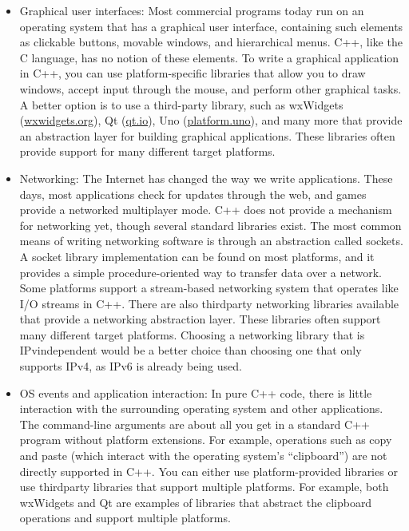 \begin{itemize}
\item
Graphical user interfaces: Most commercial programs today run on an operating system that has a graphical user interface, containing such elements as clickable buttons, movable windows, and hierarchical menus. C++, like the C language, has no notion of these elements. To write a graphical application in C++, you can use platform-specific libraries that allow you to draw windows, accept input through the mouse, and perform other graphical tasks. A better option is to use a third-party library, such as wxWidgets (\url{wxwidgets.org}), Qt (\url{qt.io}), Uno (\url{platform.uno}), and many more that provide an abstraction layer for building graphical applications. These libraries often provide support for many different target platforms.

\item
Networking: The Internet has changed the way we write applications. These days, most applications check for updates through the web, and games provide a networked multiplayer mode. C++ does not provide a mechanism for networking yet, though several standard libraries exist. The most common means of writing networking software is through an abstraction called sockets. A socket library implementation can be found on most platforms, and it provides a simple procedure-oriented way to transfer data over a network. Some platforms support a stream-based networking system that operates like I/O streams in C++. There are also thirdparty networking libraries available that provide a networking abstraction layer. These libraries often support many different target platforms. Choosing a networking library that is IPvindependent would be a better choice than choosing one that only supports IPv4, as IPv6 is already being used.

\item
OS events and application interaction: In pure C++ code, there is little interaction with the surrounding operating system and other applications. The command-line arguments are about all you get in a standard C++ program without platform extensions. For example, operations such as copy and paste (which interact with the operating system’s “clipboard”) are not directly supported in C++. You can either use platform-provided libraries or use thirdparty libraries that support multiple platforms. For example, both wxWidgets and Qt are examples of libraries that abstract the clipboard operations and support multiple platforms.


\end{itemize}
